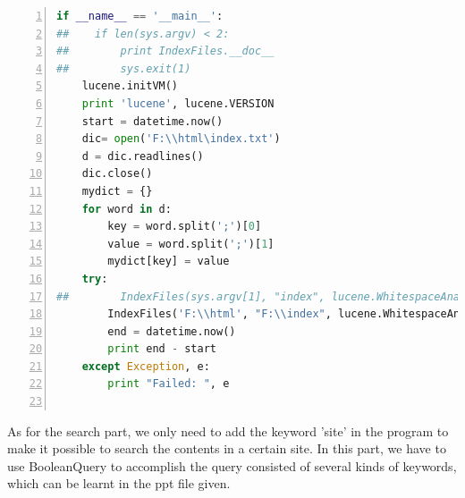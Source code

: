 \documentclass{article}
\begin{document}
\begin{lstlisting}[language=python,numbers=left,frame=leftline]
if __name__ == '__main__':
##    if len(sys.argv) < 2:
##        print IndexFiles.__doc__
##        sys.exit(1)
    lucene.initVM()
    print 'lucene', lucene.VERSION
    start = datetime.now()
    dic= open('F:\\html\index.txt')
    d = dic.readlines()
    dic.close()
    mydict = {}
    for word in d:
        key = word.split(';')[0]
        value = word.split(';')[1]
        mydict[key] = value
    try:
##        IndexFiles(sys.argv[1], "index", lucene.WhitespaceAnalyzer(lucene.Version.LUCENE_CURRENT))
        IndexFiles('F:\\html', "F:\\index", lucene.WhitespaceAnalyzer(lucene.Version.LUCENE_CURRENT))
        end = datetime.now()
        print end - start
    except Exception, e:
        print "Failed: ", e


\end{lstlisting}
As for the search part, we only need to add the keyword 'site' in the program to make it possible to search the contents in a certain site. In this part, we have to use BooleanQuery to accomplish the query consisted of several kinds of keywords, which can be learnt in the ppt file given.
\end{document}
